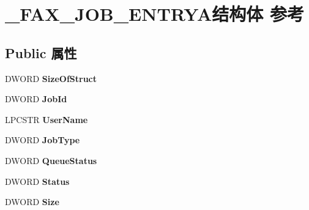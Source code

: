 \hypertarget{struct___f_a_x___j_o_b___e_n_t_r_y_a}{}\section{\+\_\+\+F\+A\+X\+\_\+\+J\+O\+B\+\_\+\+E\+N\+T\+R\+Y\+A结构体 参考}
\label{struct___f_a_x___j_o_b___e_n_t_r_y_a}
\subsection*{Public 属性}
\begin{DoxyCompactItemize}
\item 
\mbox{\label{struct___f_a_x___j_o_b___e_n_t_r_y_a_af41d82714a53aae56a86aa5845b3044f}} 
D\+W\+O\+RD {\bfseries Size\+Of\+Struct}
\item 
\mbox{\label{struct___f_a_x___j_o_b___e_n_t_r_y_a_ab4f93aac9d4a7e1e95ff1bec48b381e7}} 
D\+W\+O\+RD {\bfseries Job\+Id}
\item 
\mbox{\label{struct___f_a_x___j_o_b___e_n_t_r_y_a_aa38bf9f24b68273220fcb567963fa15a}} 
L\+P\+C\+S\+TR {\bfseries User\+Name}
\item 
\mbox{\label{struct___f_a_x___j_o_b___e_n_t_r_y_a_a94f6df5a39f38d2456ebdce66c9b2945}} 
D\+W\+O\+RD {\bfseries Job\+Type}
\item 
\mbox{\label{struct___f_a_x___j_o_b___e_n_t_r_y_a_a752ce92fd4dd247e1c208e75c97798d4}} 
D\+W\+O\+RD {\bfseries Queue\+Status}
\item 
\mbox{\label{struct___f_a_x___j_o_b___e_n_t_r_y_a_a03b20bb59b0612cec9ea99c7789c2a93}} 
D\+W\+O\+RD {\bfseries Status}
\item 
\mbox{\label{struct___f_a_x___j_o_b___e_n_t_r_y_a_a2ad59ddb8656338da73080e29471bc97}} 
D\+W\+O\+RD {\bfseries Size}
\item 
\mbox{\label{struct___f_a_x___j_o_b___e_n_t_r_y_a_aeffe5748c0ba45a282a4dff35f0664ac}} 

\end{DoxyCompactItemize}
